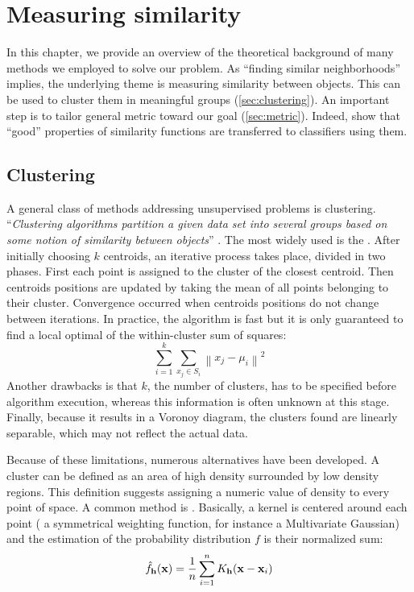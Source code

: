 \chapter{Measuring similarity}
\label{ch:background}

In this chapter, we provide an overview of the theoretical background of many
methods we employed to solve our problem. As \enquote{finding similar
neighborhoods} implies, the underlying theme is measuring similarity between
objects. This can be used to cluster them in meaningful groups
(\autoref{sec:clustering}). An important step is to tailor general metric
toward our goal (\autoref{sec:metric}). Indeed, \textcite{GoodSimilarity08}
show that \enquote{good} properties of similarity functions are transferred to
classifiers using them.

\section{Clustering}
\label{sec:clustering}

A general class of methods addressing unsupervised problems is clustering.
\enquote{\emph{Clustering algorithms partition a given data set into several
groups based on some notion of similarity between objects}}
\autocite{LimitsClustering05}. The most widely used is the
 \autocite{kmeans67}. After initially choosing
$k$ centroids, an iterative process takes place, divided in two phases. First
each point is assigned to the cluster of the closest centroid. Then centroids
positions are updated by taking the mean of all points belonging to their
cluster. Convergence occurred when centroids positions do not change between
iterations. In practice, the algorithm is fast but it is only guaranteed to
find a local optimal of the within-cluster sum of squares: \[ \sum_{i=1}^{k}
\sum_{ x_j \in S_i} \left\| x_j - \mu_i \right\|^2 \] Another drawbacks is that
$k$, the number of clusters, has to be specified before algorithm execution,
whereas this information is often unknown at this stage. Finally, because it
results in a Voronoy diagram, the clusters found are linearly separable, which
may not reflect the actual data.

Because of these limitations, numerous alternatives have been developed. A
cluster can be defined as an area of high density surrounded by low density
regions. This definition suggests assigning a numeric value of density to every
point of space. A common method is   \autocite{KDE56}. Basically, a kernel is centered around each point
(\ie{} a symmetrical weighting function, for instance a Multivariate Gaussian)
and the estimation of the probability distribution $f$ is their normalized sum:
\[ \hat{f}_\bold{h}(\bold{x})= \frac{1}{n} \sum_{i=1}^n K_\bold{h} (\bold{x} -
\bold{x}_i) \]

